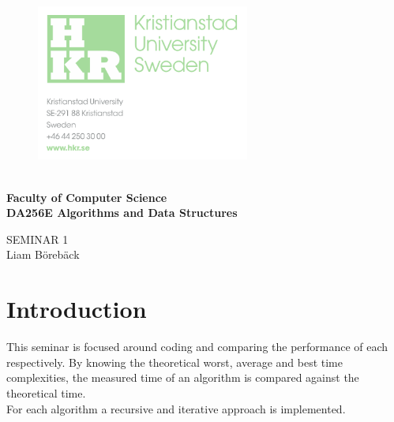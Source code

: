 \documentclass{article}
\begin{document}
	
	\begin{figure}[h!]

			\includegraphics[width=7cm]{images/hkr.png}
			\label{title}
	   \endminipage
		\endminipage
	\end{figure}
	
	\vspace{0.8cm}
	\Large

	\textbf{\\ Faculty of Computer Science\\ DA256E Algorithms and Data Structures}
	\begin{center}
	\vspace{4cm}
	\Huge
	SEMINAR 1\\
	\vspace{2cm}
	\LARGE
	Liam Börebäck
	\end{center}
	
\thispagestyle{empty}       %

\newpage
	
\tableofcontents
\large
\thispagestyle{empty}        %

\newpage
\listoffigures
\listoftables

\newpage

\newpage 

\section{Introduction}

This seminar is focused around coding and comparing the performance of each respectively. By knowing the theoretical worst, average and best time complexities, the measured time of an algorithm is compared against the theoretical time. \\
For each algorithm a recursive and iterative approach is implemented. \\
\end{document}
